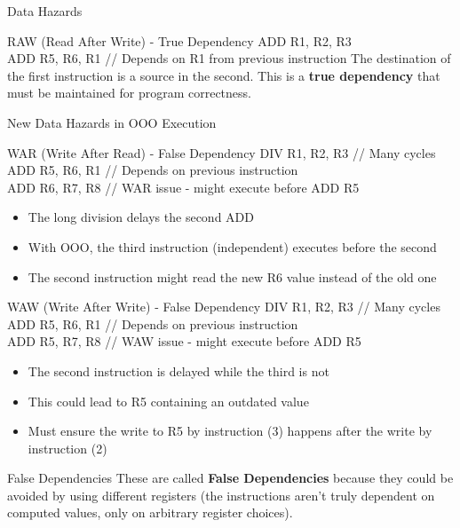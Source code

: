 \documentclass[aspectratio=169,12pt]{beamer}
\begin{document}
\begin{frame}{Data Hazards}
    \begin{block}{RAW (Read After Write) - True Dependency}
        {\ttfamily\small
        ADD R1, R2, R3\\
        ADD R5, R6, R1  // Depends on R1 from previous instruction
        }
        The destination of the first instruction is a source in the second. This is a \textbf{true dependency} that must be maintained for program correctness.
    \end{block}
\end{frame}

\begin{frame}{New Data Hazards in OOO Execution}
    \begin{block}{WAR (Write After Read) - False Dependency}
        {\ttfamily\small
        DIV R1, R2, R3  // Many cycles\\
        ADD R5, R6, R1  // Depends on previous instruction\\
        ADD R6, R7, R8  // WAR issue - might execute before ADD R5
        }
        \begin{itemize}
            \item The long division delays the second ADD
            \item With OOO, the third instruction (independent) executes before the second
            \item The second instruction might read the new R6 value instead of the old one
        \end{itemize}
    \end{block}
\end{frame}

\begin{frame}{WAW (Write After Write) - False Dependency}
    {\ttfamily\small
    DIV R1, R2, R3  // Many cycles\\
    ADD R5, R6, R1  // Depends on previous instruction\\
    ADD R5, R7, R8  // WAW issue - might execute before ADD R5
    }
    
    \begin{itemize}
        \item The second instruction is delayed while the third is not
        \item This could lead to R5 containing an outdated value
        \item Must ensure the write to R5 by instruction (3) happens after the write by instruction (2)
    \end{itemize}
    
    \begin{alertblock}{False Dependencies}
        These are called \textbf{False Dependencies} because they could be avoided by using different registers (the instructions aren't truly dependent on computed values, only on arbitrary register choices).
    \end{alertblock}
\end{frame}
\end{document}
